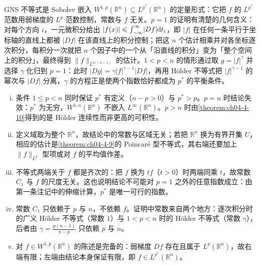 \documentclass[../../main.tex]{subfiles}%
\begin{document}
\begin{remark}\label{remark:ch04-thm-4-8-动机}
GNS 不等式是 Sobolev 嵌入 $W^{1,p}(\mathbb{R}^n)\subseteq L^{p^*}(\mathbb{R}^n)$ 的定量形式：它把 $f$ 的 $L^{p^*}$ 范数用弱梯度的 $L^p$ 范数控制，常数与 $f$ 无关。$p=1$ 的证明有清楚的几何含义：对每个方向 $i$，一元微积分给出 $\lvert f(x)\rvert\leqslant\int_{-\infty}^{\infty}\lvert Df\rvert\mathrm{d} t_i$，即 $\lvert f\rvert$ 在任何一条平行于坐标轴的直线上都被 $\lvert Df\rvert$ 在该直线上的积分控制；把这 $n$ 个估计相乘并对各坐标逐次积分，每积分一次就把 $n$ 个因子中的一个从「沿直线的积分」变为「整个空间上的积分」，最终得到 $\lVert f\rVert_{L^{n/(n-1)}}$ 的估计。$1<p<n$ 的情形通过取 $g=\lvert f\rvert^{\gamma}$ 并选择 $\gamma$ 化归到 $p=1$：此时 $\lvert Dg\rvert=\gamma\lvert f\rvert^{\gamma-1}\lvert Df\rvert$，再用 Hölder 不等式把 $\lvert f\rvert^{\gamma-1}$ 的幂次与 $\lvert Df\rvert$ 分离，$\gamma$ 的方程正是使两个指数恰好都成为 $p^*$ 的平衡条件。
\end{remark}

\begin{remark}\label{remark:ch04-thm-4-8-条件}
\begin{enumerate}[(i)]
\item 条件 $1\leqslant p<n$ 同时保证 $p^*$ 有定义（$n-p>0$）与 $p^*>p$。$p=n$ 时结论失效：$p^*$ 为无穷，$W^{1,n}(\mathbb{R}^n)$ 不嵌入 $L^\infty(\mathbb{R}^n)$。$p>n$ 时由\cref{theorem:ch04-4-10}得到的是 Hölder 连续性而非更高的可积性。%
\item 定义域取为整个 $\mathbb{R}^n$，故结论中的常数与区域无关；若把 $\mathbb{R}^n$ 换为有界开集 $U$，相应的估计是\cref{theorem:ch04-4-9}的 Poincaré 型不等式，其右端还要加上 $\lVert f\rVert_{L^p}$ 型项或对 $f$ 的平均值作差。%
\item 不等式两端关于 $f$ 都是齐次的：把 $f$ 换为 $tf$（$t>0$）时两端同乘 $t$，故常数 $C_1$ 与 $f$ 的尺度无关。这也说明结论不可能对 $p=1$ 之外的任意指数成立：由第一条注记中的伸缩计算，$p^*$ 是唯一可行的指数。
\item 常数 $C_1$ 只依赖于 $p$ 与 $n$，不依赖 $f$。证明中常数来自两个地方：逐次积分时的广义 Hölder 不等式（常数 $1$）与 $1<p<n$ 时的 Hölder 不等式（常数 $\gamma$），后者由 $\gamma=\frac{p(n-1)}{n-p}$ 只依赖 $p$ 与 $n$。
\item 对 $f\in W^{1,p}(\mathbb{R}^n)$ 的陈述是完备的：弱梯度 $Df$ 存在且属于 $L^p(\mathbb{R}^n)$，故右端有限；左端由结论本身保证有限，即 $f\in L^{p^*}(\mathbb{R}^n)$。
\end{enumerate}
\end{remark}
\end{document}
